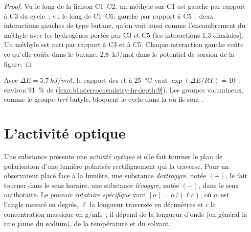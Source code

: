\begin{proof}
Vu le long de la liaison C1--C2, un méthyle  sur C1 est gauche par
rapport à C3 du cycle~; vu le long de C1--C6, gauche par rapport à C5~:
deux interactions gauches de type butane, qu'on voit aussi comme
l'encombrement du méthyle avec les hydrogènes  portés par C3 et C5
(les interactions 1,3-diaxiales). Un méthyle  est anti par
rapport à C3 et à C5. Chaque interaction gauche coûte ce qu'elle coûte
dans le butane, \qty{2.8}{kJ/mol} dans le potentiel de torsion de la
figure.
\end{proof}

Avec $\Delta E = \qty{5.7}{kJ/mol}$, le rapport des  
et  à \qty{25}{\celsius} vaut $\exp(\Delta E/RT) = 10$~: environ
\qty{91}{\percent} de  
(\cref{exo:b1:stereochemistry-in-depth:9}). Les groupes volumineux,
comme le groupe \textit{tert}-butyle, bloquent le cycle dans la  où
ils sont .

\section{L'activité optique}

\begin{definition}\label{def:b1:stereochemistry-in-depth:optical-activity}
Une substance présente une \emph{activité optique} si elle
fait tourner le plan de polarisation d'une lumière polarisée
rectilignement qui la traverse. Pour un observateur placé face à la
lumière, une substance \emph{dextrogyre}, notée
$(+)$, le fait tourner dans le sens horaire, une substance
\emph{lévogyre}, notée $(-)$, dans le sens antihoraire. Le
\emph{pouvoir rotatoire spécifique} vaut
$[\alpha] = \alpha/(\ell c)$, où $\alpha$ est l'angle mesuré en degrés,
$\ell$ la longueur traversée en décimètres et $c$ la concentration
massique en \unit{g/mL}~; il dépend de la longueur d'onde (en général la
raie jaune du sodium), de la température et du solvant.
\end{definition}

